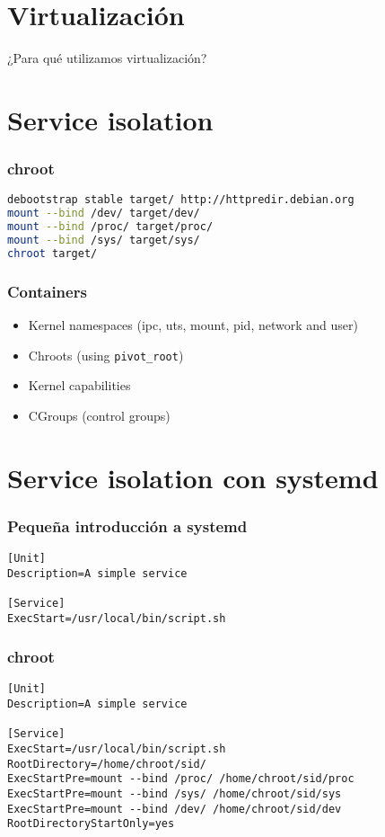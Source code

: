 \section{Virtualización}
\begin{frame}
  \vfill
  ¿Para qué utilizamos virtualización?
  \vfill
\end{frame}

\section{Service isolation}
\begin{frame}[fragile]
  \frametitle{chroot}

\begin{lstlisting}[language=sh]
debootstrap stable target/ http://httpredir.debian.org
mount --bind /dev/ target/dev/
mount --bind /proc/ target/proc/
mount --bind /sys/ target/sys/
chroot target/
\end{lstlisting}

\end{frame}

\begin{frame}
  \frametitle{Containers}
  \begin{itemize}
    
  \item     Kernel namespaces (ipc, uts, mount, pid, network and user)
  \item     Chroots (using \texttt{pivot\_root})
  \item     Kernel capabilities
  \item     CGroups (control groups)

  \end{itemize}
\end{frame}

\section{Service isolation con systemd}
\begin{frame}[fragile]
  \frametitle{Pequeña introducción a systemd}

  \begin{lstlisting}
[Unit]
Description=A simple service

[Service]
ExecStart=/usr/local/bin/script.sh
\end{lstlisting}

\end{frame}

\begin{frame}[fragile]
  \frametitle{chroot}
\begin{lstlisting}
[Unit]
Description=A simple service

[Service]
ExecStart=/usr/local/bin/script.sh
RootDirectory=/home/chroot/sid/
ExecStartPre=mount --bind /proc/ /home/chroot/sid/proc
ExecStartPre=mount --bind /sys/ /home/chroot/sid/sys
ExecStartPre=mount --bind /dev/ /home/chroot/sid/dev
RootDirectoryStartOnly=yes
\end{lstlisting}
\end{frame}



